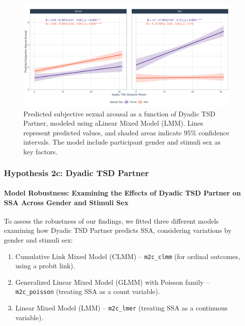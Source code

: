 \documentclass[
  bookmarksnumbered]{article}
\providecommand{\tightlist}{%
  \setlength{\itemsep}{0pt}\setlength{\parskip}{0pt}}
\begin{document}
\begin{figure}
\centering
\includegraphics{Sexual_Desire_Arousal_anonymous_files/figure-latex/fig-h2b-1.pdf}
\caption{\label{fig:fig-h2b}Predicted subjective sexual arousal as a function of Dyadic TSD Partner, modeled using aLinear Mixed Model (LMM). Lines represent predicted values, and shaded areas indicate 95\% confidence intervals. The model include participant gender and stimuli sex as key factors.}
\end{figure}

\subsubsection{Hypothesis 2c: Dyadic TSD Partner}\label{hyp2c}

\paragraph{Model Robustness: Examining the Effects of Dyadic TSD Partner on SSA Across Gender and Stimuli Sex}\label{model-robustness-examining-the-effects-of-dyadic-tsd-partner-on-ssa-across-gender-and-stimuli-sex}

To assess the robustness of our findings, we fitted three different models examining how Dyadic TSD Partner predicts SSA, considering variations by gender and stimuli sex:

\begin{enumerate}
\def\labelenumi{\arabic{enumi}.}
\tightlist
\item
  Cumulative Link Mixed Model (CLMM) -- \texttt{m2c\_clmm} (for ordinal outcomes, using a probit link).
\item
  Generalized Linear Mixed Model (GLMM) with Poisson family -- \texttt{m2c\_poisson} (treating SSA as a count variable).
\item
  Linear Mixed Model (LMM) -- \texttt{m2c\_lmer} (treating SSA as a continuous variable).
\end{enumerate}
\end{document}

